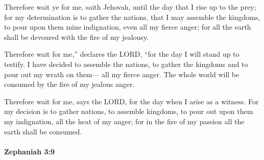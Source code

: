 			\begin{versebox}
					\item[BHS] 
					\item[LXX] 
					\item[ASV] Therefore wait ye for me, saith Jehovah, until the day that I rise up to the prey; for my determination is to gather the nations, that I may assemble the kingdoms, to pour upon them mine indignation, even all my fierce anger; for all the earth shall be devoured with the fire of my jealousy.
					\item[NIV] Therefore wait for me,” declares the LORD, “for the day I will stand up to testify. I have decided to assemble the nations, to gather the kingdoms and to pour out my wrath on them— all my fierce anger. The whole world will be consumed by the fire of my jealous anger.
					\item[NRSV] Therefore wait for me, says the LORD, for the day when I arise as a witness. For my decision is to gather nations, to assemble kingdoms, to pour out upon them my indignation, all the heat of my anger; for in the fire of my passion all the earth shall be consumed.
			\end{versebox}

		\paragraph{Zephaniah 3:9} %
			\label{ZEPHANIAH-3-9}

